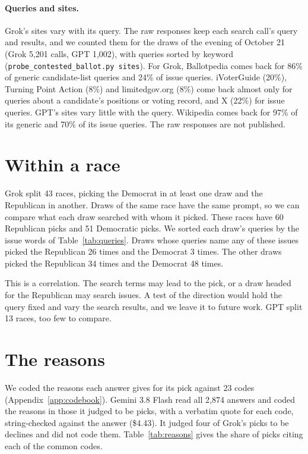 \documentclass[11pt]{article}
\begin{document}
\paragraph{Queries and sites.} Grok's sites vary with its query. The raw responses keep each search call's query and results,
and we counted them for the draws of the evening of October 21 (Grok 5,201 calls, GPT 1,002),
with queries sorted by keyword (\texttt{probe\_contested\_ballot.py sites}). For Grok, Ballotpedia comes back for 86\% of generic
candidate-list queries and 24\% of issue queries. iVoterGuide (20\%), Turning Point Action
(8\%) and limitedgov.org (8\%) come back almost only for queries about a candidate's positions
or voting record, and X (22\%) for issue queries. GPT's sites vary little with the query.
Wikipedia comes back for 97\% of its generic and 70\% of its issue queries. The raw responses are
not published.

\section{Within a race}
\label{sec:within}

Grok split 43 races, picking the Democrat in at least one draw and the Republican in another.
Draws of the same race have the same prompt, so we can compare what each draw searched with whom
it picked. These races have 60 Republican picks and 51 Democratic picks. We sorted each draw's
queries by the issue words of Table~\ref{tab:queries}. Draws whose queries name any of these
issues picked the Republican 26 times and the Democrat 3 times. The other draws picked the
Republican 34 times and the Democrat 48 times.

This is a correlation. The search terms may lead to the pick, or a draw headed for the Republican
may search issues. A test of the direction would hold the query fixed and vary the
search results, and we leave it to future work. GPT split 13 races, too few to compare.

\section{The reasons}
\label{sec:reasons}

We coded the reasons each answer gives for its pick against 23 codes (Appendix~\ref{app:codebook}).
Gemini 3.8 Flash read all 2,874 answers and coded the reasons in those it judged to be picks, with
a verbatim quote for each code, string-checked against the answer (\$4.43). It judged four of
Grok's picks to be declines and did not code them. Table~\ref{tab:reasons} gives the share of
picks citing each of the common codes. 
\end{document}
